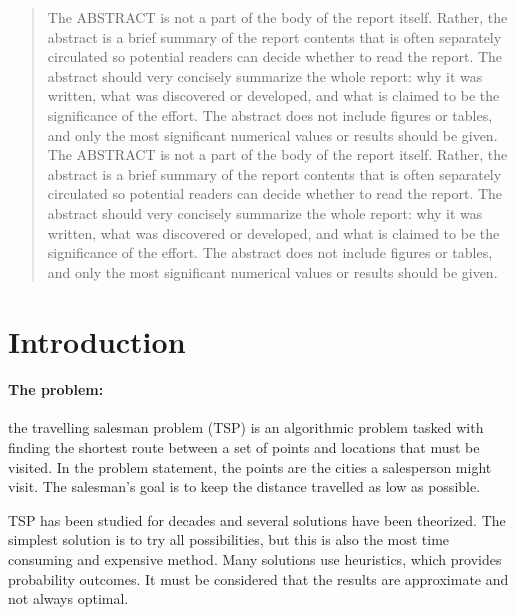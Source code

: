 \documentclass[10pt]{article}
\begin{document}
\begin{abstract}
The ABSTRACT is not a part of the body of the report itself. Rather, the abstract is a brief summary of the report contents that is often separately circulated so potential readers can decide whether to read the report. The abstract should very concisely summarize the whole report: why it was written, what was discovered or developed, and what is claimed to be the significance of the effort. The abstract does not include figures or tables, and only the most significant numerical values or results should be given.
The ABSTRACT is not a part of the body of the report itself. Rather, the abstract is a brief summary of the report contents that is often separately circulated so potential readers can decide whether to read the report. The abstract should very concisely summarize the whole report: why it was written, what was discovered or developed, and what is claimed to be the significance of the effort. The abstract does not include figures or tables, and only the most significant numerical values or results should be given.
\end{abstract}

\newpage
\tableofcontents
\newpage
\section{Introduction}
\paragraph{The problem:}
the travelling salesman problem (TSP) is an algorithmic problem tasked with finding the shortest route between a set of points and locations that must be visited. 
In the problem statement, the points are the cities a salesperson might visit. The salesman's goal is to keep the distance travelled as low as possible. 

TSP has been studied for decades and several solutions have been theorized. 
The simplest solution is to try all possibilities, but this is also the most time consuming and expensive method. 
Many solutions use heuristics, which provides probability outcomes. 
It must be considered that the results are approximate and not always optimal. 
\end{document}
